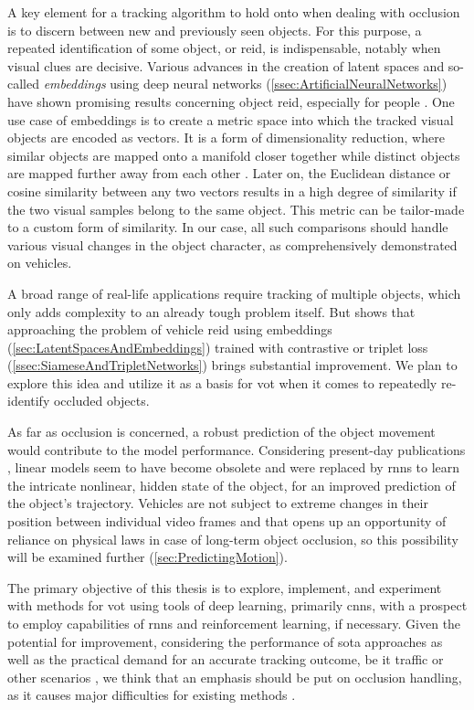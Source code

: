 A key element for a tracking algorithm to hold onto when dealing with occlusion is to discern between new and previously seen objects. For this purpose, a repeated identification of some object, or \gls{reid}, is indispensable, notably when visual clues are decisive. Various advances in the creation of latent spaces and so-called \emph{embeddings} using deep neural networks (\cref{ssec:ArtificialNeuralNetworks}) have shown promising results concerning object \gls{reid}, especially for people \cite{Schroff2015, Taigman2014}. One use case of embeddings is to create a metric space into which the tracked visual objects are encoded as vectors. It is a form of dimensionality reduction, where similar objects are mapped onto a manifold closer together while distinct objects are mapped further away from each other \cite{Hadsell2006}. Later on, the Euclidean distance or cosine similarity between any two vectors results in a high degree of similarity if the two visual samples belong to the same object. This metric can be tailor-made to a custom form of similarity. In our case, all such comparisons should handle various visual changes in the object character, as \cite{Kuma2019} comprehensively demonstrated on vehicles.

A broad range of real-life applications require tracking of multiple objects, which only adds complexity to an already tough problem itself. But \cite{Kuma2019} shows that approaching the problem of vehicle \gls{reid} using embeddings (\cref{sec:LatentSpacesAndEmbeddings}) trained with contrastive or triplet loss (\cref{ssec:SiameseAndTripletNetworks}) brings substantial improvement. We plan to explore this idea and utilize it as a basis for \gls{vot} when it comes to repeatedly re-identify occluded objects.

As far as occlusion is concerned, a robust prediction of the object movement would contribute to the model performance. Considering present-day publications \cite{Tan2019}, linear models seem to have become obsolete and were replaced by \glspl{rnn} to learn the intricate nonlinear, hidden state of the object, for an improved prediction of the object’s trajectory. Vehicles are not subject to extreme changes in their position between individual video frames and that opens up an opportunity of reliance on physical laws in case of long-term object occlusion, so this possibility will be examined further (\cref{sec:PredictingMotion}).

The primary objective of this thesis is to explore, implement, and experiment with methods for \gls{vot} using tools of deep learning, primarily \glspl{cnn}, with a prospect to employ capabilities of \glspl{rnn} and reinforcement learning, if necessary. Given the potential for improvement, considering the performance of \gls{sota} approaches as well as the practical demand for an accurate tracking outcome, be it traffic or other scenarios \cite{Tang2019}, we think that an emphasis should be put on occlusion handling, as it causes major difficulties for existing methods \cite{Jiyan2007}.

